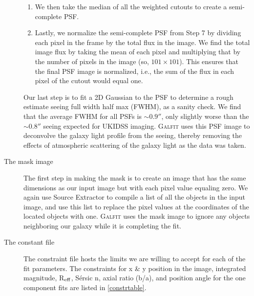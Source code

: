 \documentclass[iop,apj]{emulateapj}
\newcommand{\Reff}{R$_{\rm eff}$}
\begin{document}
\begin{description}
{\begin{enumerate}
\item We then take the median of all the weighted cutouts to create a semi-complete PSF.

\item Lastly, we normalize the semi-complete PSF from Step 7 by dividing each pixel in the frame by the total flux in the image. We find the total image flux by taking the mean of each pixel and multiplying that by the number of pixels in the image (so, $101\times101$). This ensures that the final PSF image is normalized, i.e., the sum of the flux in each pixel of the cutout would equal one.    

\end{enumerate}

\noindent Our last step is to fit a 2D Gaussian to the PSF to determine a rough estimate seeing full width half max (FWHM), as a sanity check. We find that the average FWHM for all PSFs is $\sim 0.9''$, only slightly worse than the $\sim 0.8''$ seeing expected for UKIDSS imaging. \textsc{Galfit} uses this PSF image to deconvolve the galaxy light profile from the seeing, thereby removing the effects of atmospheric scattering of the galaxy light as the data was taken.}

\item[The mask image]{The first step in making the mask is to create an image that has the same dimensions as our input image but with each pixel value equaling zero. We again use Source Extractor to compile a list of all the objects in the input image, and  use this list to replace the pixel values at the coordinates of the located objects with one. \textsc{Galfit} uses the mask image to ignore any objects neighboring our galaxy while it is completing the fit.}

\item[The constant file]{The constraint file hosts the limits we are willing to accept for each of the fit parameters. The constraints for x \& y position in the image, integrated magnitude, \Reff, S\'ersic n, axial ratio (b/a), and position angle for the one component fits are listed in \autoref{constrtable}. }

\end{description}
\end{document}
